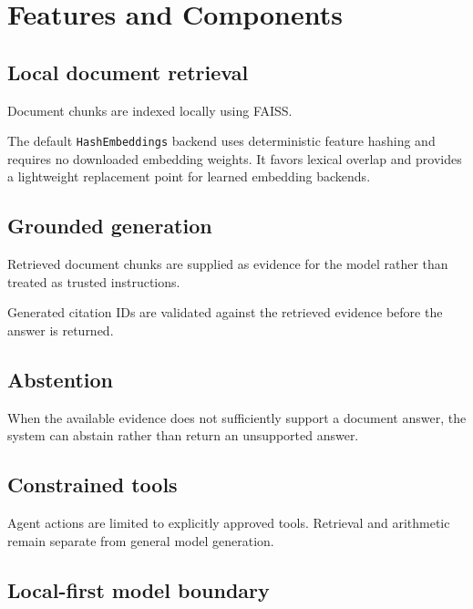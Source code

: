
\section{Features and Components}

\subsection{Local document retrieval}

Document chunks are indexed locally using FAISS.

The default \texttt{HashEmbeddings} backend uses deterministic feature hashing and requires no downloaded embedding weights. It favors lexical overlap and provides a lightweight replacement point for learned embedding backends.

\subsection{Grounded generation}

Retrieved document chunks are supplied as evidence for the model rather than treated as trusted instructions.

Generated citation IDs are validated against the retrieved evidence before the answer is returned.

\subsection{Abstention}

When the available evidence does not sufficiently support a document answer, the system can abstain rather than return an unsupported answer.

\subsection{Constrained tools}

Agent actions are limited to explicitly approved tools. Retrieval and arithmetic remain separate from general model generation.

\subsection{Local-first model boundary}

